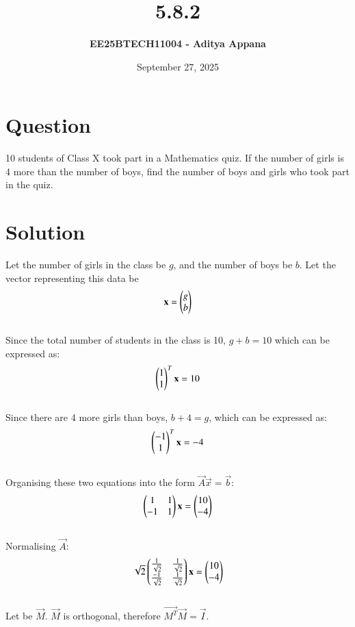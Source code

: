 \documentclass[12pt]{article}
\title{\textbf{5.8.2}}
\author{\textbf{EE25BTECH11004 - Aditya Appana}}
\date{September 27, 2025}
\begin{document}
\maketitle

\section*{Question}
10 students of Class X took part in a Mathematics quiz. If the number of girls is 4
more than the number of boys, find the number of boys and girls who took part in
the quiz.

\section*{Solution}

Let the number of girls in the class be $g$, and the number of boys be $b$. Let the vector representing this data be 
\begin{align}
\mathbf{x} = \begin{pmatrix}g\\b\end{pmatrix}    
\end{align}\\
Since the total number of students in the class is 10, $g+b=10$ which can be expressed as:
\begin{align}
\begin{pmatrix}1\\1\end{pmatrix}^T\mathbf{x} = 10
\end{align}\\
Since there are 4 more girls than boys, $b+4=g$, which can be expressed as:
\begin{align}
\begin{pmatrix}-1 \\ 1\end{pmatrix}^T\mathbf{x} = -4
\end{align}\\
Organising these two equations into the form $\vec{A}\vec{x} = \vec{b}$:
\begin{align}
\begin{pmatrix}1&1 \\ -1&1\end{pmatrix} \mathbf{x} = \begin{pmatrix}10\\-4\end{pmatrix}
\end{align}\\
Normalising $\vec{A}$: 
\begin{align}
\sqrt{2} \begin{pmatrix}\frac{1}{\sqrt{2}} & \frac{1}{\sqrt{2}} \\  \frac{-1}{\sqrt{2}}& \frac{1}{\sqrt{2}}\end{pmatrix} \mathbf{x} = \begin{pmatrix}10\\-4\end{pmatrix}\\
\end{align}\\
Let  be $\vec{M}$. $\vec{M}$ is orthogonal, therefore $\vec{M^T}\vec{M} = \vec{I}$.\\
\end{document}

